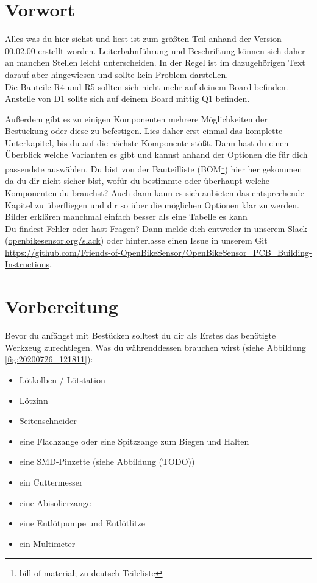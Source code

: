 \documentclass[12pt, a4paper]{article}		%
\begin{document}
\section{Vorwort}

Alles was du hier siehst und liest ist zum größten Teil anhand der Version 00.02.00 erstellt worden. Leiterbahnführung und Beschriftung können sich daher an manchen Stellen leicht unterscheiden. In der Regel ist im dazugehörigen Text darauf aber hingewiesen und sollte kein Problem darstellen.\\
Die Bauteile R4 und R5 sollten sich nicht mehr auf deinem Board befinden. Anstelle von D1 sollte sich auf deinem Board mittig Q1 befinden. \\ \newline

Außerdem gibt es zu einigen Komponenten mehrere Möglichkeiten der Bestückung oder diese zu befestigen. Lies daher erst einmal das komplette Unterkapitel, bis du auf die nächste Komponente stößt. Dann hast du einen Überblick welche Varianten es gibt und kannst anhand der Optionen die für dich passendste auswählen. Du bist von der Bauteilliste (BOM\footnote{bill of material; zu deutsch Teileliste}) hier her gekommen da du dir nicht sicher bist, wofür du bestimmte oder überhaupt welche Komponenten du brauchst? Auch dann kann es sich anbieten das entsprechende Kapitel zu überfliegen und dir so über die möglichen Optionen klar zu werden. Bilder erklären manchmal einfach besser als eine Tabelle es kann \\
Du findest Fehler oder hast Fragen? Dann melde dich entweder in unserem Slack (\href{openbikesensor.org/slack}{openbikesensor.org/slack}) oder hinterlasse einen Issue in unserem Git \href{https://github.com/Friends-of-OpenBikeSensor/OpenBikeSensor_PCB_Building-Instructions}{https://github.com/Friends-of-OpenBikeSensor/OpenBikeSensor\_PCB\_Building-Instructions}. 



\section{Vorbereitung}

Bevor du anfängst mit Bestücken solltest du dir als Erstes das benötigte Werkzeug zurechtlegen. Was du währenddessen brauchen wirst (siehe Abbildung \ref{fig:20200726_121811}):

\begin{itemize}
	\item Lötkolben / Lötstation
	\item Lötzinn
	\item Seitenschneider
	\item eine Flachzange oder eine Spitzzange zum Biegen und Halten
	\item eine SMD-Pinzette (siehe Abbildung (TODO))
	\item ein Cuttermesser
	\item eine Abisolierzange
	\item eine Entlötpumpe und Entlötlitze
	\item ein Multimeter
\end{itemize}
\end{document}

